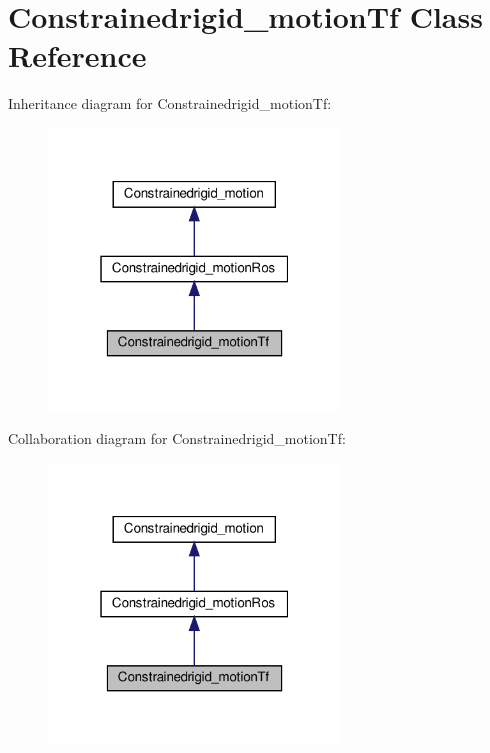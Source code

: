 \hypertarget{classConstrainedrigid__motionTf}{}\section{Constrainedrigid\+\_\+motion\+Tf Class Reference}
\label{classConstrainedrigid__motionTf}


Inheritance diagram for Constrainedrigid\+\_\+motion\+Tf\+:\nopagebreak
\begin{figure}[H]
\begin{center}
\leavevmode
\includegraphics[width=220pt]{df/dc5/classConstrainedrigid__motionTf__inherit__graph}
\end{center}
\end{figure}


Collaboration diagram for Constrainedrigid\+\_\+motion\+Tf\+:\nopagebreak
\begin{figure}[H]
\begin{center}
\leavevmode
\includegraphics[width=220pt]{da/d05/classConstrainedrigid__motionTf__coll__graph}
\end{center}
\end{figure}
